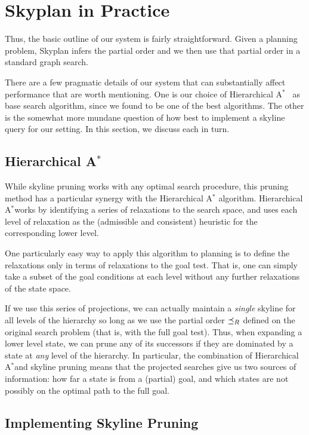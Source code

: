 \documentclass[letterpaper]{article}
\theoremstyle{plain} \newtheorem{theorem}{Theorem} \newtheorem{proposition}{Proposition} \newtheorem{lemma}{Lemma}
\theoremstyle{definition} \newtheorem{definition}{Definition} \newtheorem{conjecture}{Conjecture} \newtheorem*{example}{Example}
\theoremstyle{remark} \newtheorem*{remark}{Remark} \newtheorem*{note}{Note} \newtheorem{case}{Case}
\newcommand{\Astar}{A$^*$}
\begin{document}
\section{Skyplan in Practice}

Thus, the basic outline of our system is fairly straightforward.
Given a planning problem, Skyplan infers the partial order
and we then use that partial order in a standard graph search.

There are a few pragmatic details of our system that can substantially
affect performance that are worth mentioning. One is our choice of
Hierarchical \Astar~\citep{holte1996hierarchical} as base search
algorithm, since we found to be one of the best algorithms. The
other is the somewhat more mundane question of how best to implement
a skyline query for our setting.  In this section, we discuss each
in turn.

\subsection{Hierarchical \Astar}

While skyline pruning works with any optimal search procedure, this
pruning method has a particular synergy with the Hierarchical \Astar
algorithm. Hierarchical \Astar works
by identifying a series of relaxations to the search space, and
uses each level of relaxation as the (admissible and consistent)
heuristic for the corresponding lower level.

One particularly easy way to apply this algorithm to planning is
to define the relaxations only in terms of relaxations to the goal
test. That is, one can simply take a subset of the goal conditions
at each level without any further relaxations of the state space. 

If we use this series of projections, we can actually maintain a
\textit{single} skyline for all levels of the hierarchy so long as
we use the partial order $\preceq_R$ defined on the original search problem
(that is, with the full goal test). Thus, when expanding a lower
level state, we can prune any of its successors if they are dominated
by a state at \textit{any} level of the hierarchy.  In particular,
the combination of Hierarchical \Astar and skyline pruning means
that the projected searches give us two sources of information: how
far a state is from a (partial) goal, and which states are not
possibly on the optimal path to the full goal. 

\subsection{Implementing Skyline Pruning}
\end{document}
